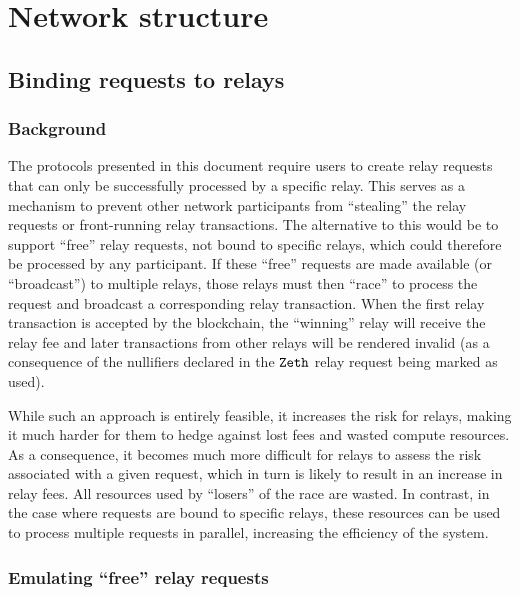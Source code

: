 
\chapter{Network structure}\label{chap:unicast-vs-broadcast}

\section{Binding requests to relays}

\subsection{Background}

The protocols presented in this document require users to create relay requests that can only be successfully processed by a specific relay. This serves as a mechanism to prevent other network participants from ``stealing'' the relay requests or front-running relay transactions. The alternative to this would be to support ``free'' relay requests, not bound to specific relays, which could therefore be processed by any participant. If these ``free'' requests are made available (or ``broadcast'') to multiple relays, those relays must then ``race'' to process the request and broadcast a corresponding relay transaction. When the first relay transaction is accepted by the blockchain, the ``winning'' relay will receive the relay fee and later transactions from other relays will be rendered invalid (as a consequence of the nullifiers declared in the $\texttt{Zeth}$ relay request being marked as used).

While such an approach is entirely feasible, it increases the risk for relays, making it much harder for them to hedge against lost fees and wasted compute resources. As a consequence, it becomes much more difficult for relays to assess the risk associated with a given request, which in turn is likely to result in an increase in relay fees. All resources used by ``losers'' of the race are wasted.  In contrast, in the case where requests are bound to specific relays, these resources can be used to process multiple requests in parallel, increasing the efficiency of the system.

\subsection{Emulating ``free'' relay requests}\label{unicast-vs-broadcast:requests:emulate-free-requests}

